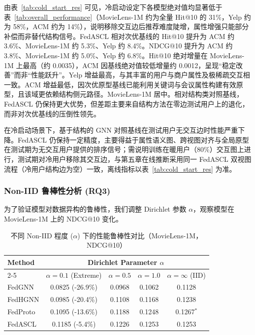 由表~\ref{tab:cold_start_res} 可见，冷启动设定下各模型绝对值均显著低于表~\ref{tab:overall_performance}（MovieLens-1M 约为全量 Hit@10 的 31\%，Yelp 约为 58\%，ACM 约为 14\%），说明移除交互边后推荐难度陡增，属性增强只能部分补偿而非替代结构信号。FedASCL 相对次优基线的 Hit@10 提升为 ACM 约 3.6\%、MovieLens-1M 约 5.3\%、Yelp 约 8.4\%。NDCG@10 提升为 ACM 约 3.8\%、MovieLens-1M 约 5.0\%、Yelp 约 6.8\%。Hit@10 绝对增量在 MovieLens-1M 上最高（约 0.0035），ACM 因基线绝对值较低增量约 0.0012，呈现“稳定改善”而非“性能跃升”。Yelp 增益最高，与其丰富的用户与商户属性及极稀疏交互相一致。ACM 增益最低，因次优原型基线已能利用关键词与会议属性构建有效原型，且该域更依赖结构侧元路径。MovieLens-1M 居中。相对结构类对照基线，FedASCL 仍保持更大优势，但差距主要来自结构方法在零边测试用户上的退化，而非对次优基线的压倒性领先。

在冷启动场景下，基于结构的 GNN 对照基线在测试用户无交互边时性能严重下降。FedASCL 仍保持一定精度，主要得益于属性语义图、跨视图对齐与全局原型在测试期为无交互用户提供的排序信号；需说明训练在暖用户（80\%）交互图上进行，测试期对冷用户移除其交互边，与第五章在线推断采用同一 FedASCL 双视图流程（冷用户结构边为空）一致，离线指标以表~\ref{tab:cold_start_res} 为准。

\subsubsection{Non-IID 鲁棒性分析 (RQ3)}
\label{subsubsec:non_iid}

为了验证模型对数据异构的鲁棒性，我们调整 Dirichlet 参数 $\alpha$，观察模型在 MovieLens-1M 上的 NDCG@10 变化。

\begin{table}[H]
    \centering
    \caption{不同 Non-IID 程度 ($\alpha$) 下的性能鲁棒性对比（MovieLens-1M，NDCG@10）}
    \label{tab:non_iid_data}
    \begin{tabular}{lcccc}
        \toprule
        \multirow{2}{*}{Method} & \multicolumn{4}{c}{Dirichlet Parameter  $\alpha$} \\
        \cmidrule(lr){2-5}
         & $\alpha=0.1$ (Extreme) & $\alpha=0.5$ & $\alpha=1.0$ & $\alpha=\infty$ (IID) \\
        \midrule
        FedGNN   & 0.0825 (-26.9\%) & 0.0968 & 0.1062 & 0.1128 \\
        FedHGNN  & 0.0985 (-20.4\%) & 0.1108 & 0.1168 & 0.1238 \\
        FedProto & 0.1095 (-13.6\%) & 0.1188 & 0.1248 & 0.1267$^*$ \\
        FedASCL & 0.1185 (-5.4\%) & 0.1226 & 0.1253 & 0.1253 \\
        \bottomrule
    \end{tabular}
\end{table}

